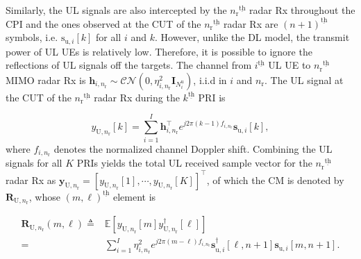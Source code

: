 \documentclass[10pt,journal]{IEEEtran}
\newcommand{\paren}[1]{\left({#1}\right)}
\newcommand{\bracket}[1]{{\left [{#1}\right ]}}
\newcommand{\ith}[1]    {{#1}^{\underline{\text{th}}}}
\newcommand{\rr}{_\mathrm{r}}
\newcommand{\duin}{\mathbf{d}_{\textrm{u},i}\bracket{k,l}}
\newcommand{\PiB}{\mathbf{P}_{\textrm{u},i}\bracket{k}}
\theoremstyle{definition}
\begin{document}
Similarly, the UL signals are also intercepted by the $\ith{n\rr}$ radar Rx throughout the CPI and the ones observed at the CUT of the $\ith{n\rr}$ radar Rx are $\ith{\paren{n+1}}$ symbols, i.e. $\mathrm{s}_{\textrm{u},i}\bracket{k}$ for all $i$ and $k$. 
However, unlike the DL model, the transmit power of UL UEs is relatively low. Therefore, it is possible to ignore the reflections of UL signals off the targets. The channel from $\ith{i}$ UL UE to $\ith{n\rr}$ MIMO radar Rx is $\mathbf{h}_{i,n\rr}\sim\mathcal{CN}\paren{0,\eta^2_{i,n\rr}\mathbf{I}_{\mathit{N}^{\textrm{u}}_i}}$, i.i.d in $i$ and $n\rr$. 
The UL signal at the CUT of the $\ith{n\rr}$ radar Rx during the $\ith{k}$ PRI is \par\noindent\small
\begin{equation}
y_{\textrm{U},n\rr}\bracket{k}=\sum_{i=1}^{\mathit{I}}\mathbf{h}^\top_{i,n\rr}e^{j2\pi(k-1) f_{i,n_\mathrm{r}}}\mathbf{s}_{\textrm{u},i}\bracket{k},\label{eq:UL1}
\end{equation}\normalsize
where $f_{i,n_\mathrm{r}}$ denotes the normalized channel Doppler shift. Combining the UL signals for all $\mathit{K}$ PRIs yields the total UL received sample vector for the $\ith{n\rr}$ radar Rx as  $\mathbf{y}_{\mathrm{U},n\rr}=\bracket{y_{\textrm{U},n\rr}\bracket{1},\cdots,y_{\textrm{U},n\rr}\bracket{\mathit{K}}}^\top$, of which the CM is denoted by  $\mathbf{R}_{\mathrm{U},n\rr}$, whose
$\ith{\paren{m,\ell}}$ element %
is  \par\noindent\small
\begin{align}
\mathbf{R}_{\mathrm{U},n\rr}\paren{m,\ell}\triangleq&\mathbb{E}\bracket{y_{\mathrm{U},n\rr}\bracket{m}y^\dagger_{\mathrm{U},n\rr}\bracket{\ell}}\nonumber\\
=&\sum_{i=1}^{\mathit{I}}\eta^2_{i,n\rr}e^{j2\pi\paren{m-\ell}f_{i,n\rr}}\mathbf{s}^\dagger_{\mathrm{u},i}\bracket{\ell,n+1}\mathbf{s}_{\mathrm{u},i}\bracket{m,n+1}.\nonumber
\end{align}\normalsize
\end{document}
